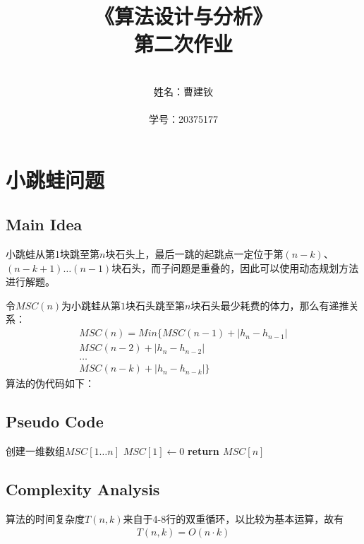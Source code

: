 \documentclass{ctexart}
\title{《算法设计与分析》\\ 第二次作业}
\author{\\姓名：曹建钬 \\  \\
学号：20375177}
\date{}
\begin{document}
\pagestyle{empty}
\thispagestyle{empty}
\maketitle
\clearpage

\section{小跳蛙问题}


\subsection{Main Idea}
小跳蛙从第1块跳至第$n$块石头上，最后一跳的起跳点一定位于第$(n-k)$、$(n-k+1) \ldots (n-1)$块石头，而子问题是重叠的，因此可以使用动态规划方法进行解题。

令$MSC(n)$为小跳蛙从第$1$块石头跳至第$n$块石头最少耗费的体力，那么有递推关系：
\begin{align*}
    MSC(n) = Min\{MSC(n-1)+|h_n-h_{n-1}|\\
    MSC(n-2)+|h_n-h_{n-2}| \\
    \ldots \\
    MSC(n-k)+|h_n-h_{n-k}|
    \}
\end{align*}
算法的伪代码如下：
\subsection{Pseudo Code}

\begin{algorithm}[H]
    \SetAlgoLined %
	\caption{$Minimum-Strength-Cost(n,H,k)$}%
	\BlankLine
	\BlankLine
	创建一维数组$MSC[1\ldots n]$ \;
	$MSC[1] \leftarrow 0$ \; 
	{}
	\textbf{return $MSC[n]$}
\end{algorithm}

\subsection{Complexity Analysis}
算法的时间复杂度$T(n,k)$来自于4-8行的双重循环，以比较为基本运算，故有
\begin{align*}
    T(n,k) = O(n \cdot k)
\end{align*}
\end{document}
